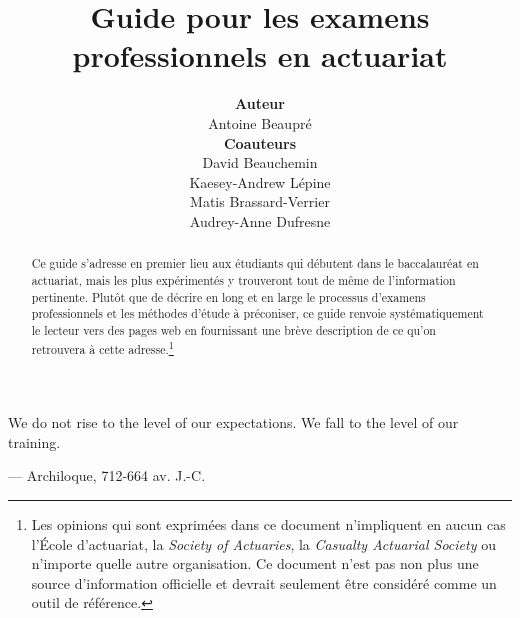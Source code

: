 \documentclass[11pt,french]{article}
\title{\vspace{2cm}
	   Guide pour les examens professionnels en actuariat
       \vspace{2cm}}
\author{\textbf{Auteur} \\
				Antoine Beaupré \vspace{2cm} \\
				\textbf{Coauteurs} \\
				David Beauchemin \\ 
				Kaesey-Andrew Lépine \\
				Matis Brassard-Verrier\\
				Audrey-Anne Dufresne\vspace{4cm}}
\begin{document}
\maketitle
\thispagestyle{fancy}

\newpage

\begin{abstract}
Ce guide s'adresse en premier lieu aux étudiants qui débutent dans le baccalauréat en actuariat, mais les plus expérimentés y trouveront tout de même de l'information pertinente. Plutôt que de décrire en long et en large le processus d'examens professionnels et les méthodes d'étude à préconiser, ce guide renvoie systématiquement le lecteur vers des pages web en fournissant une brève description de ce qu'on retrouvera à cette adresse.\footnote{Les opinions qui sont exprimées dans ce document n'impliquent en aucun cas l'École d'actuariat, la \emph{Society of Actuaries}, la \emph{Casualty Actuarial Society} ou n'importe quelle autre organisation. Ce document n'est pas non plus une source d'information officielle et devrait seulement être considéré comme un outil de référence.}{\tiny} 
\end{abstract}

\clearpage
{}
\begin{center}
\begin{minipage}{.6\textwidth}
\epigraph{We do not rise to the level of our expectations. We fall to the level of our training.}{--- \textup{Archiloque}, 712-664 av. J.-C.}
\end{minipage}
\end{center}
\clearpage

\newpage
\tableofcontents

\newpage
{}
\setcounter{page}{1}









\end{document}
